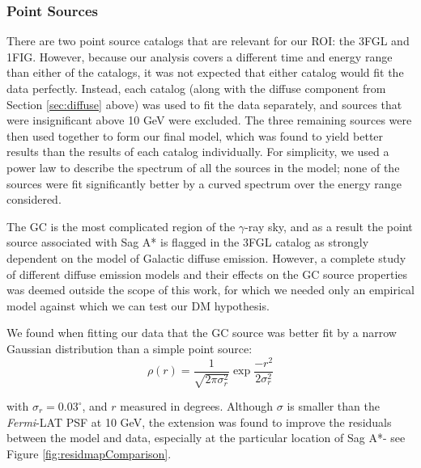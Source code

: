 \subsubsection{Point Sources}
There are two point source catalogs that are relevant for our ROI: the 3FGL and 1FIG.
However, because our analysis covers a different time and energy range than either of the catalogs, it was not expected that either catalog would fit the data perfectly.
Instead, each catalog (along with the diffuse component from Section \ref{sec:diffuse} above) was used to fit the data separately, and sources that were insignificant above 10 GeV were excluded.
The three remaining sources were then used together to form our final model, which was found to yield better results than the results of each catalog individually.
For simplicity, we used a power law to describe the spectrum of all the sources in the model; none of the sources were fit significantly better by a curved spectrum over the energy range considered.

The GC is the most complicated region of the $\gamma$-ray sky, and as a result the point source associated with Sag A* is flagged in the 3FGL catalog as strongly dependent on the model of Galactic diffuse emission. 
However, a complete study of different diffuse emission models and their effects on the GC source properties was deemed outside the scope of this work, for which we needed only an empirical model against which we can test our DM hypothesis.

We found when fitting our data that the GC source was better fit by a narrow Gaussian distribution than a simple point source:
\begin{equation}
\rho (r) = \frac{1}{\sqrt{2\pi\sigma_r^2}}\exp{\frac{-r^2}{2\sigma_r^2}}
\end{equation}

with $\sigma_{r}=0.03^\circ$, and $r$ measured in degrees.
Although $\sigma$ is smaller than the {\it Fermi}-LAT PSF at 10 GeV, the extension was found to improve the residuals between the model and data, especially at the particular location of Sag A*- see Figure \ref{fig:residmapComparison}. 


